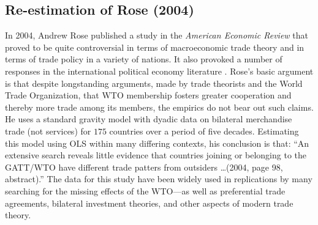 \documentclass{article}[12pt]
\begin{document}
\subsection{Re-estimation of Rose (2004)}

\nocite{rose:2004}
In 2004, Andrew Rose published a study in the \textit{American Economic Review} that proved to be quite controversial in terms of macroeconomic trade theory and in terms of trade policy in a variety of nations. It also provoked a number of responses in the international political economy literature \citep{tomz:etal:2007,ward:etal:2013}.  Rose's basic argument is that despite longstanding arguments, made by trade theorists and the World Trade Organization, that WTO membership fosters greater cooperation and thereby more trade among its members, the empirics do not bear out such claims. He uses a standard gravity model with dyadic data on bilateral merchandise trade (not services) for $175$ countries over a period of five decades. Estimating this model using OLS within many differing contexts, his conclusion is that: ``An extensive search reveals little evidence that countries joining or belonging to the GATT/WTO have different trade patters from outsiders \ldots (2004, page 98, abstract).''  The data for this study have been widely used in replications by many searching for the missing effects of the WTO---as well as preferential trade agreements, bilateral investment theories, and other aspects of modern trade theory.  
\end{document}

